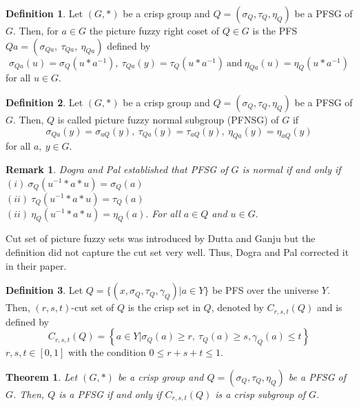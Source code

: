 \documentclass[12pt,letterpaper]{amsart}
\theoremstyle{plain}
\newtheorem{theorem}{Theorem}[section]
\newtheorem{remark}{Remark}[section]
\theoremstyle{definition}
\newtheorem{definition}{Definition}[section]
\numberwithin{equation}{section}
\begin{document}
\begin{definition}\cite{dp}
Let $(G, \ast)$ be a crisp group and $Q = (\sigma_{Q}, \tau_Q, \eta_Q)$ be a PFSG of $G$. Then, for $a \in G$ the picture fuzzy right coset of $Q \in G$ is the PFS $Qa = (\sigma_{Qa},~ \tau_{Qa},~ \eta_{Qa})$ defined by $$\sigma_{Qa}(u) = \sigma_{Q} (u \ast a^{-1}),~ \tau_{Qa}(y) = \tau_{Q} (u \ast a^{-1})~ \text{and}~ \eta_{Qa}(u) = \eta_{Q} ( u \ast a^{-1})$$ for all $u \in G$.
\end{definition}

\begin{definition}\cite{dp}
Let $(G, \ast)$ be a crisp group and $Q = (\sigma_{Q}, \tau_Q, \eta_Q)$ be a PFSG of $G$. Then, $Q$ is called picture fuzzy normal subgroup (PFNSG) of $G$ if $$\sigma_{Qa}(y) = \sigma_{aQ}(y),~ \tau_{Qa}(y) = \tau_{aQ}(y),~ \eta_{Qa}(y) = \eta_{aQ}(y)$$ for all $a,~ y \in G$.
\end{definition}
\begin{remark}
Dogra and Pal established that PFSG of $G$ is normal if and only if\\ $(i)~ \sigma_{Q}(u^{-1} \ast a \ast u) = \sigma_{Q}(a)$\\ $(ii)~ \tau_{Q}(u^{-1} \ast a \ast u) = \tau_{Q}(a) $\\ $(ii)~ \eta_{Q}(u^{-1} \ast a \ast u) = \eta_{Q}(a).$ For all $a \in Q$ and $u \in G.$
\end{remark}

Cut set of picture fuzzy sets was introduced by Dutta and Ganju \cite{dg} but the definition did not capture the cut set very well. Thus, Dogra and Pal \cite{dp} corrected it in their paper.

\begin{definition} \cite{dp}
Let $Q  = \lbrace (x, \sigma_{Q}, \tau_{Q}, \gamma_{Q})| a \in Y \rbrace$ be PFS over the universe $Y$. Then, $(r,s,t)$-cut set of $Q$ is the crisp set in $Q$, denoted by $C_{r, s, t} (Q)$ and is defined by $$C_{r, s, t} (Q) = \left\lbrace a \in Y | \sigma_{Q}(a) \geq r,~\tau_{Q}(a) \geq s, \gamma_{Q}(a) \leq t  \right\rbrace$$ $r, s, t \in [0, 1]$ with the condition  $0 \leq r + s + t \leq 1.$
\end{definition}

\begin{theorem} \cite{dp} \label{1}
Let $(G, \ast)$ be a crisp group and $Q = (\sigma_{Q}, \tau_Q, \eta_Q)$ be a PFSG of $G$. Then, $Q$ is a PFSG if and only if $C_{r, s, t} (Q)$ is a crisp subgroup of $G$.
\end{theorem}
\end{document}
